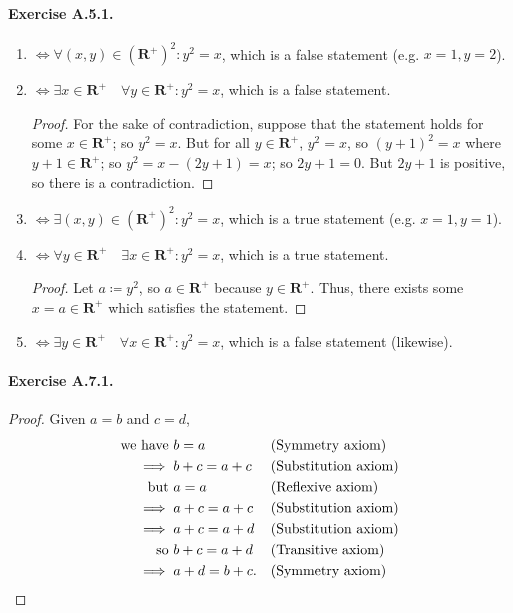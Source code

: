 \paragraph{Exercise A.5.1.}
\begin{enumerate}
    \item $\iff \forall (x,y) \in (\mathbf{R}^+)^2  : y^2=x$, which is a false statement (e.g. $x=1,y=2$). 
    \item $\iff \exists x \in \mathbf{R}^+ \quad \forall y \in \mathbf{R}^+ : y^2=x$, which is a false statement. \begin{proof}
        For the sake of contradiction, suppose that the statement holds for some $x \in \mathbf{R}^+$; so $y^2=x$. But for all $y \in \mathbf{R}^+$, $y^2=x$, so $(y+1)^2=x$ where $y+1 \in \mathbf{R}^+$; so $y^2=x-(2y+1)=x$; so $2y+1=0$. But $2y+1$ is positive, so there is a contradiction.
    \end{proof}
    \item $\iff \exists (x,y) \in (\mathbf{R}^+)^2  : y^2=x$, which is a true statement (e.g. $x=1,y=1$). 
    \item $\iff \forall y \in \mathbf{R}^+ \quad \exists x \in \mathbf{R}^+ : y^2=x$, which is a true statement. \begin{proof}
        Let $a \coloneq {y}^2$, so $a\in \mathbf{R}^+$ because $y \in \mathbf{R}^+$. Thus, there exists some $x=a\in \mathbf{R}^+$ which satisfies the statement.
    \end{proof}
    \item $\iff \exists y \in \mathbf{R}^+ \quad \forall x \in \mathbf{R}^+ : y^2=x$, which is a false statement (likewise).
\end{enumerate}

\paragraph{Exercise A.7.1.}
\begin{proof}
    Given $a=b$ and $c = d$,
    \begin{align*}
        \text{we have } {} &b=a && \text{(Symmetry axiom)}\\
        \implies {} &b+c=a+c && \text{(Substitution axiom)}\\
        \text{but } {} &a=a && \text{(Reflexive axiom)}\\
        \implies {} &a+c=a+c && \text{(Substitution axiom)}\\
        \implies {} &a+c=a+d && \text{(Substitution axiom)}\\
        \text{so } {} &b+c=a+d && \text{(Transitive axiom)}\\
        \implies {} &a+d=b+c. && \text{(Symmetry axiom)} \qedhere
    \end{align*}
\end{proof}